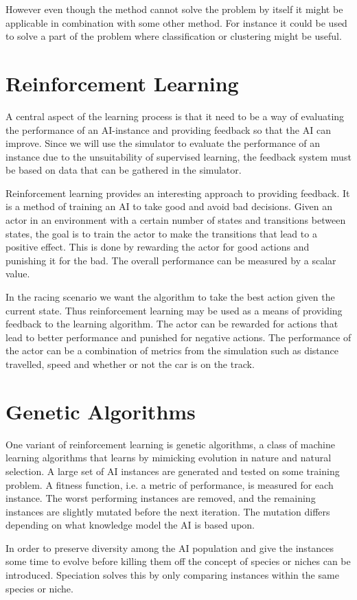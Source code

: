 However even though the method cannot solve the problem by itself it might be applicable in combination with some other method. For instance it could be used to solve a part of the problem where classification or clustering might be useful.

\section{Reinforcement Learning}
A central aspect of the learning process is that it need to be a way of evaluating the performance of an AI-instance and providing feedback so that the AI can improve. Since we will use the simulator to evaluate the performance of an instance due to the unsuitability of supervised learning, the feedback system must be based on data that can be gathered in the simulator. 

Reinforcement learning provides an interesting approach to providing feedback. It is a method of training an AI to take good and avoid bad decisions. Given an actor in an environment with a certain number of states and transitions between states, the goal is to train the actor to make the transitions that lead to a positive effect. This is done by rewarding the actor for good actions and punishing it for the bad.\cite{barber} The overall performance can be measured by a scalar value.

In the racing scenario we want the algorithm to take the best action given the current state. Thus reinforcement learning may be used as a means of providing feedback to the learning algorithm. The actor can be rewarded for actions that lead to better performance and punished for negative actions. The performance of the actor can be a combination of metrics from the simulation such as distance travelled, speed and whether or not the car is on the track.



\section{Genetic Algorithms}
One variant of reinforcement learning is genetic algorithms, a class of machine learning algorithms that learns by mimicking evolution in nature and natural selection. A large set of AI instances are generated and tested on some training problem. A fitness function, i.e. a metric of performance, is measured for each instance. The worst performing instances are removed, and the remaining instances are slightly mutated before the next iteration. The mutation differs depending on what knowledge model the AI is based upon. 

In order to preserve diversity among the AI population and give the instances some time to evolve before killing them off the concept of species or niches can be introduced.\cite{mario} Speciation solves this by only comparing instances within the same species or niche. 
